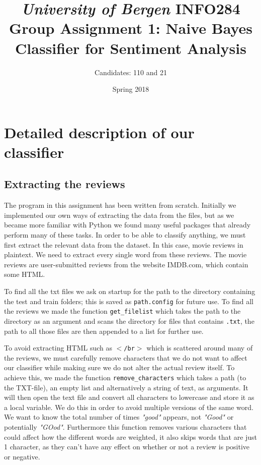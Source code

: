 \documentclass[a4paper,12pt]{article}
\title{\textit{University of Bergen}
\linebreak{}
\textbf{INFO284}
\linebreak{}
\linebreak{}
Group Assignment 1:
\linebreak{}
Naive Bayes Classifier for Sentiment Analysis}
\author{Candidates: 110 and 21}
\date{Spring 2018}
\begin{document}
\begin{titlingpage}
\maketitle
\tableofcontents
\end{titlingpage}


\section{Detailed description of our classifier}

\subsection{Extracting the reviews}
The program in this assignment has been written from scratch. Initially we implemented our own ways of extracting the data from the files, but as we became more familiar with Python we found many useful packages that already perform many of these tasks. In order to be able to classify anything, we must first extract the relevant data from the dataset. In this case, movie reviews in plaintext. We need to extract every single word from these reviews. The movie reviews are user-submitted reviews from the website IMDB.com, which contain some HTML. 

To find all the txt files we ask on startup for the path to the directory containing the test and train folders; this is saved as \texttt{path.config} for future use. To find all the reviews we made the function \texttt{get\_filelist} which takes the path to the directory as an argument and scans the directory for files that contains \texttt{.txt}, the path to all those files are then appended to a list for further use.

To avoid extracting HTML such as \texttt{$<$/br$>$} which is scattered around many of the reviews, we must carefully remove characters that we do not want to affect our classifier while making sure we do not alter the actual review itself. To achieve this, we made the function \texttt{remove\_characters} which takes a path (to the TXT-file), an empty list and alternatively a string of text, as arguments. It will then open the text file and convert all characters to lowercase and store it as a local variable. We do this in order to avoid multiple versions of the same word. We want to know the total number of times \textit{"good"} appears, not \textit{"Good"} or potentially \textit{"GOod"}. Furthermore this function removes various characters that could affect how the different words are weighted, it also skips words that are just 1 character, as they can't have any effect on whether or not a review is positive or negative.
\end{document}
